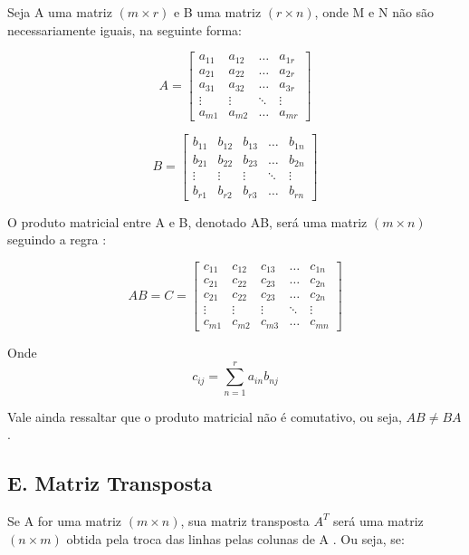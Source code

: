 \documentclass[twocolumn, 10pt,a4paper]{extarticle}
\begin{document}
Seja A uma matriz $(m \times r)$ e B uma matriz $(r \times n)$, onde M e N não são necessariamente iguais, na seguinte forma:

\[ 
A = 
\begin{bmatrix}
a_{11} & a_{12} & \dots & a_{1r} \\
a_{21} & a_{22} & \dots & a_{2r} \\
a_{31} & a_{32} & \dots & a_{3r} \\
\vdots & \vdots & \ddots & \vdots \\
a_{m1} & a_{m2} & \dots & a_{mr} 

\end{bmatrix}
\]

\[ 
B = 
\begin{bmatrix}
b_{11} & b_{12} & b_{13} & \dots & b_{1n} \\
b_{21} & b_{22} & b_{23} & \dots & b_{2n} \\
\vdots & \vdots & \vdots & \ddots & \vdots \\
b_{r1} & b_{r2} & b_{r3} & \dots & b_{rn} 

\end{bmatrix}
\]

O produto matricial entre A e B, denotado AB, será uma matriz $(m \times n)$ seguindo a regra \cite[p. 30]{antonAlgebra}: 

\[ 
AB = C =
\begin{bmatrix}
c_{11} & c_{12} & c_{13} & \dots & c_{1n} \\
c_{21} & c_{22} & c_{23} & \dots & c_{2n} \\
c_{21} & c_{22} & c_{23} & \dots & c_{2n} \\
\vdots & \vdots & \vdots & \ddots & \vdots \\
c_{m1} & c_{m2} & c_{m3} & \dots & c_{mn} 

\end{bmatrix}
\]

Onde \[c_{ij} = \sum_{n=1}^{r} a_{in}b_{nj}\]

Vale ainda ressaltar que o produto matricial não é comutativo, ou seja, $AB \neq BA$.

\subsection*{E. \quad Matriz Transposta}

Se A for uma matriz $(m \times n)$, sua matriz transposta $A^T$ será uma matriz $(n \times m)$ obtida pela troca das linhas pelas colunas de A \cite[p. 34]{antonAlgebra}. Ou seja, se:
\end{document}
